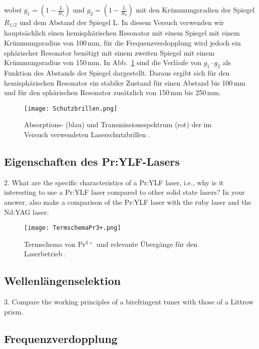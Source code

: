 wobei $g_1=(1-\frac{L}{R_1})$ und $g_2=(1-\frac{L}{R_2})$ mit den Krümmungsradien der Spiegel $R_{1/2}$ und dem Abstand der Spiegel L. In diesem Versuch verwenden wir hauptsächlich einen hemisphärischen Resonator mit einem Spiegel mit einem Krümmungsradius
von 100\,mm, für die Frequenzverdopplung wird jedoch ein sphärischer Resonator benötigt mit 
einem zweiten Spiegel mit einem Krümmungsradius von 150\,mm.
In Abb.~\ref{img:stabkrit} sind die Verläufe von $g_1 \cdot g_2$ als Funktion des Abstands der Spiegel dargestellt. Daraus ergibt sich für den hemisphärischen Resonator ein stabiler Zustand für einen Abstand bis 100\,mm und für den sphärischen Resonator zusätzlich von 150\,mm bis 250\,mm.

\begin{figure}[H]
\begin{center}
  \texttt{[image: Schutzbrillen.png]}
  \caption{Absorptions- (blau)  und Transmissionsspektrum (rot) der im Versuch
  verwendeten Laserschutzbrillen \cite{Versuchsanleitung}.}
  \label{img:stabkrit}
\end{center}
\end{figure}


\subsection{Eigenschaften des Pr:YLF-Lasers}

2. What are the specific characteristics of a Pr:YLF laser, i.e., why is it interesting to use a Pr:YLF
laser compared to other solid state lasers? In your answer, also make a comparison of the Pr:YLF
laser with the ruby laser and the Nd:YAG laser.

\begin{figure}[H]
\begin{center}
  \texttt{[image: TermschemaPr3+.png]}
  \caption{Termschema von Pr$^{3+}$ und relevante Übergänge für den Laserbetrieb
  \cite{Versuchsanleitung}.}
  \label{img:Termschema}
\end{center}
\end{figure}

\subsection{Wellenlängenselektion}


3. Compare the working principles of a birefringent tuner with those of a Littrow prism.


\subsection{Frequenzverdopplung}

